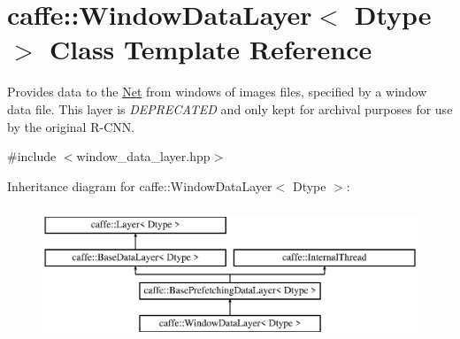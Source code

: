\hypertarget{classcaffe_1_1WindowDataLayer}{}\section{caffe\+:\+:Window\+Data\+Layer$<$ Dtype $>$ Class Template Reference}
\label{classcaffe_1_1WindowDataLayer}


Provides data to the \hyperlink{classcaffe_1_1Net}{Net} from windows of images files, specified by a window data file. This layer is {\itshape D\+E\+P\+R\+E\+C\+A\+T\+ED} and only kept for archival purposes for use by the original R-\/\+C\+NN.  




{\ttfamily \#include $<$window\+\_\+data\+\_\+layer.\+hpp$>$}

Inheritance diagram for caffe\+:\+:Window\+Data\+Layer$<$ Dtype $>$\+:\begin{figure}[H]
\begin{center}
\leavevmode
\includegraphics[height=4.000000cm]{classcaffe_1_1WindowDataLayer}
\end{center}
\end{figure}
